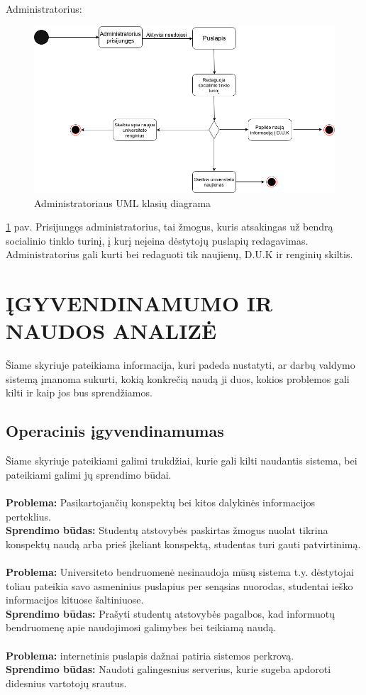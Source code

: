 \documentclass{VUMIFPSkursinis}
\begin{document}
Administratorius: \\
\begin{figure}[H]
\centering
\includegraphics[width=\linewidth]{img/administratorius.png}
\caption{Administratoriaus UML klasių diagrama}
\label{fig:administratoriu}
\end{figure}
\ref{fig:administratoriu} pav. Prisijungęs administratorius, tai žmogus, kuris atsakingas už bendrą socialinio tinklo turinį, į kurį neįeina dėstytojų puslapių redagavimas. Administratorius gali kurti bei redaguoti tik naujienų, D.U.K ir renginių skiltis.\\

\newpage
\section{ĮGYVENDINAMUMO IR NAUDOS ANALIZĖ}
Šiame skyriuje pateikiama informacija, kuri padeda nustatyti, ar darbų valdymo sistemą
įmanoma sukurti, kokią konkrečią naudą ji duos, kokios problemos gali kilti ir kaip jos bus sprendžiamos.

\subsection{Operacinis įgyvendinamumas}
Šiame skyriuje pateikiami galimi trukdžiai, kurie gali kilti naudantis sistema, bei pateikiami
galimi jų sprendimo būdai.\\
\\
\textbf{Problema:}
Pasikartojančių konspektų bei kitos dalykinės informacijos perteklius.
\\
\textbf{Sprendimo būdas:}
Studentų atstovybės paskirtas žmogus nuolat tikrina konspektų naudą arba prieš įkeliant konspektą, studentas turi gauti patvirtinimą.\\
\\
\textbf{Problema:}
Universiteto bendruomenė nesinaudoja mūsų sistema t.y. dėstytojai toliau pateikia savo asmeninius puslapius per senąsias nuorodas, studentai ieško informacijos kituose šaltiniuose.
\\
\textbf{Sprendimo būdas:}
Prašyti studentų atstovybės pagalbos, kad informuotų bendruomenę apie naudojimosi galimybes bei teikiamą naudą.\\
\\
\textbf{Problema:}
internetinis puslapis dažnai patiria sistemos perkrovą.
\\
\textbf{Sprendimo būdas:}
Naudoti galingesnius serverius, kurie sugeba apdoroti didesnius vartotojų srautus.
\end{document}
